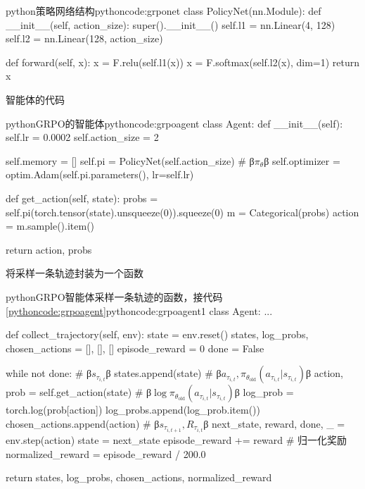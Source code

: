 \documentclass[lang=cn,newtx,10pt,scheme=chinese]{elegantbook}
\begin{document}
\begin{codebox}{python}{策略网络结构}{pythoncode:grponet}
class PolicyNet(nn.Module):
    def __init__(self, action_size):
        super().__init__()
        self.l1 = nn.Linear(4, 128)
        self.l2 = nn.Linear(128, action_size)

    def forward(self, x):
        x = F.relu(self.l1(x))
        x = F.softmax(self.l2(x), dim=1)
        return x
\end{codebox}

智能体的代码

\begin{codebox}{python}{GRPO的智能体}{pythoncode:grpoagent}
class Agent:
    def __init__(self):
        self.lr = 0.0002
        self.action_size = 2

        self.memory = []
        self.pi = PolicyNet(self.action_size) # β$\pi_\theta$β
        self.optimizer = optim.Adam(self.pi.parameters(), lr=self.lr)

    def get_action(self, state):
        probs = self.pi(torch.tensor(state).unsqueeze(0)).squeeze(0)
        m = Categorical(probs)
        action = m.sample().item()

        return action, probs
\end{codebox}

将采样一条轨迹封装为一个函数

\begin{codebox}{python}{GRPO智能体采样一条轨迹的函数，接代码\ref{pythoncode:grpoagent}}{pythoncode:grpoagent1}
class Agent:
    ...

    def collect_trajectory(self, env):
        state = env.reset()
        states, log_probs, chosen_actions = [], [], []
        episode_reward = 0
        done = False

        while not done:
            # β$s_{\tau_{i,t}}$β
            states.append(state)
            # β$a_{\tau_{i,t}},\pi_{\theta_\text{old}}(a_{\tau_{i,t}}|s_{\tau_{i,t}})$β
            action, prob = self.get_action(state)
            # β$\log\pi_{\theta_\text{old}}(a_{\tau_{i,t}}|s_{\tau_{i,t}})$β
            log_prob = torch.log(prob[action])
            log_probs.append(log_prob.item())
            chosen_actions.append(action)
            # β$s_{\tau_{i,t+1}},R_{\tau_{i,t}}$β
            next_state, reward, done, _ = env.step(action)
            state = next_state
            episode_reward += reward
        # 归一化奖励
        normalized_reward = episode_reward / 200.0

        return states, log_probs, chosen_actions, normalized_reward
\end{codebox}
\end{document}
